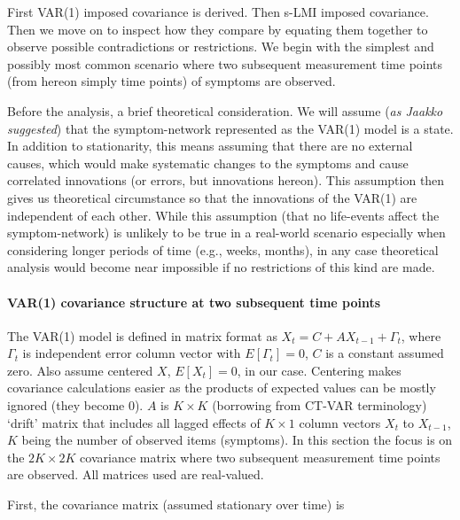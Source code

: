 \documentclass[
  letterpaper,
  DIV=11,
  numbers=noendperiod]{scrartcl}
\let\oldparagraph\paragraph
\renewcommand{\paragraph}[1]{\oldparagraph{#1}\mbox{}}
\begin{document}
First VAR(1) imposed covariance is derived. Then s-LMI imposed
covariance. Then we move on to inspect how they compare by equating them
together to observe possible contradictions or restrictions. We begin
with the simplest and possibly most common scenario where two subsequent
measurement time points (from hereon simply time points) of symptoms are
observed.

Before the analysis, a brief theoretical consideration. We will assume
(\emph{as Jaakko suggested}) that the symptom-network represented as the
VAR(1) model is a state. In addition to stationarity, this means
assuming that there are no external causes, which would make systematic
changes to the symptoms and cause correlated innovations (or errors, but
innovations hereon). This assumption then gives us theoretical
circumstance so that the innovations of the VAR(1) are independent of
each other. While this assumption (that no life-events affect the
symptom-network) is unlikely to be true in a real-world scenario
especially when considering longer periods of time (e.g., weeks,
months), in any case theoretical analysis would become near impossible
if no restrictions of this kind are made.

\hypertarget{var1-covariance-structure-at-two-subsequent-time-points}{%
\paragraph{VAR(1) covariance structure at two subsequent time
points}\label{var1-covariance-structure-at-two-subsequent-time-points}}

The VAR(1) model is defined in matrix format as
\(X_{t}=C+AX_{t-1}+\Gamma_t\), where \(\Gamma_t\) is independent error
column vector with \(E[\Gamma_t]=0\), \(C\) is a constant assumed zero.
Also assume centered \(X\), \(E[X_t]=0\), in our case. Centering makes
covariance calculations easier as the products of expected values can be
mostly ignored (they become 0). \(A\) is \(K \times K\) (borrowing from
CT-VAR terminology) `drift' matrix that includes all lagged effects of
\(K\times1\) column vectors \(X_t\) to \(X_{t-1}\), \(K\) being the
number of observed items (symptoms). In this section the focus is on the
\(2K\times2K\) covariance matrix where two subsequent measurement time
points are observed. All matrices used are real-valued.

First, the covariance matrix (assumed stationary over time) is
\end{document}
